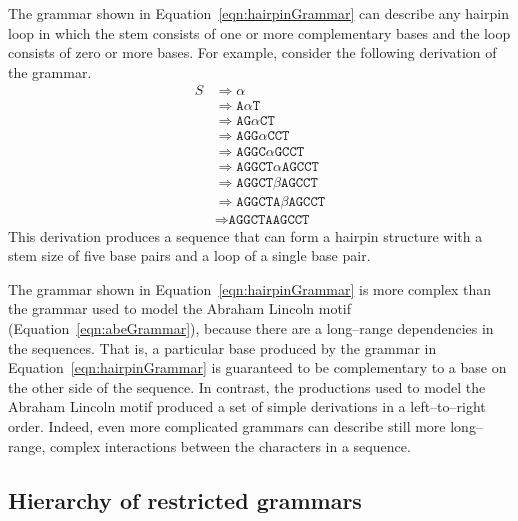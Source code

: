 The grammar shown in Equation~\vref{eqn:hairpinGrammar} can describe
any hairpin loop in which the stem consists of one or more
complementary bases and the loop consists of zero or more bases.  For
example, consider the following derivation of the grammar.
\begin{equation}\label{eqn:hairpinDerivation}
\begin{split}
    S &\Rightarrow \alpha \\
    &\Rightarrow \texttt{A}\alpha\texttt{T} \\
        &\Rightarrow \texttt{AG}\alpha\texttt{CT} \\
        &\Rightarrow \texttt{AGG}\alpha\texttt{CCT} \\
        &\Rightarrow \texttt{AGGC}\alpha\texttt{GCCT} \\
        &\Rightarrow \texttt{AGGCT}\alpha\texttt{AGCCT} \\
        &\Rightarrow \texttt{AGGCT}\beta\texttt{AGCCT} \\
        &\Rightarrow \texttt{AGGCTA}\beta\texttt{AGCCT} \\
        &\Rightarrow \texttt{AGGCTAAGCCT}
\end{split}
\end{equation}
This derivation produces a sequence that can form a hairpin
structure with a stem size of five base pairs and a loop of a single
base pair.

The grammar shown in Equation~\vref{eqn:hairpinGrammar} is more
complex than the grammar used to model the Abraham Lincoln motif
(Equation~\vref{eqn:abeGrammar}), because there are a long--range
dependencies in the sequences.  That is, a particular base produced
by the grammar in Equation~\ref{eqn:hairpinGrammar} is guaranteed
to be complementary to a base on the other side of the sequence.  In
contrast, the productions used to model the Abraham Lincoln motif
produced a set of simple derivations in a left--to--right order.
Indeed, even more complicated grammars can describe still more
long--range, complex interactions between the characters in a
sequence.


\subsection*{Hierarchy of restricted grammars}

